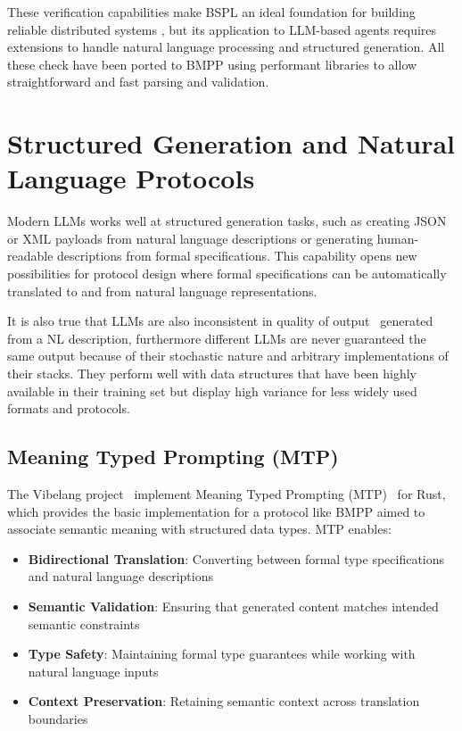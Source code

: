 \documentclass[11pt,a4paper]{article}
\begin{document}
	\vspace{0.3cm}
	\noindent These verification capabilities make BSPL an ideal foundation for building reliable distributed systems \cite{chopra-bspl}, but its application to LLM-based agents requires extensions to handle natural language processing and structured generation. All these check have been ported to BMPP using performant libraries to allow straightforward and fast parsing and validation.
	
	\section{Structured Generation and Natural Language Protocols}
	\label{sec:structured-generation}
	
	Modern LLMs works well at structured generation tasks, such as creating JSON or XML payloads from natural language descriptions or generating human-readable descriptions from formal specifications. This capability opens new possibilities for protocol design where formal specifications can be automatically translated to and from natural language representations. 
	
	It is also true that LLMs are also inconsistent in quality of output~\cite{structeval2025} generated from a NL description, furthermore different LLMs are never guaranteed the same output because of their stochastic nature and arbitrary implementations of their stacks. They perform well with data structures that have been highly available in their training set but display high variance for less widely used formats and protocols.
	
	\subsection{Meaning Typed Prompting (MTP)}
	\label{subsec:mtp}
	
	The Vibelang project~\cite{vibelang-rs} implement Meaning Typed Prompting (MTP)~\cite{mtp2024} for Rust, which provides the basic implementation for a protocol like BMPP aimed to associate semantic meaning with structured data types. MTP enables:
	
	\begin{itemize}
		\item \textbf{Bidirectional Translation}: Converting between formal type specifications and natural language descriptions
		\item \textbf{Semantic Validation}: Ensuring that generated content matches intended semantic constraints
		\item \textbf{Type Safety}: Maintaining formal type guarantees while working with natural language inputs
		\item \textbf{Context Preservation}: Retaining semantic context across translation boundaries
	\end{itemize}
	
\end{document}

